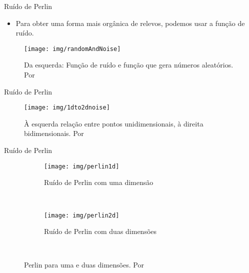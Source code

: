 
\begin{frame}{Ruído de Perlin}
    \begin{itemize}\setlength\itemsep{1em}
        \item Para obter uma forma mais orgânica de relevos, podemos usar a função de ruído.  
    \end{itemize}
    \begin{figure}[H]
        \centering
        \texttt{[image: img/randomAndNoise]}
        \caption{Da esquerda: Função de ruído e função que gera números aleatórios. Por \cite{shiffman2012nature}}
        \label{fig:randomAndNoise}
    \end{figure}
    
\end{frame}

\begin{frame}{Ruído de Perlin}
    \begin{figure}[H]
        \centering
        \texttt{[image: img/1dto2dnoise]}
        \caption{À esquerda relação entre pontos unidimensionais, à direita bidimensionais. Por \cite{shiffman2012nature}}
        \label{fig:1dto2dnoise}
    \end{figure}
    
\end{frame}



\begin{frame}{Ruído de Perlin}
    
    \begin{figure}
        \centering
        \begin{subfigure}[b]{0.6\textwidth}
            \texttt{[image: img/perlin1d]}
            \caption{Ruído de Perlin com uma dimensão}
            \label{fig:perlin1d}
        \end{subfigure}
        ~ %
        \begin{subfigure}[b]{0.35\textwidth}
            \texttt{[image: img/perlin2d]}
            \caption{Ruído de Perlin com duas dimensões}
            \label{fig:perlin2d}
        \end{subfigure}
        ~ %
        \caption{Perlin para uma e duas dimensões. Por \cite{elias2000perlin}}
        \label{fig:perlin1d2d}
    \end{figure}
    
\end{frame}

